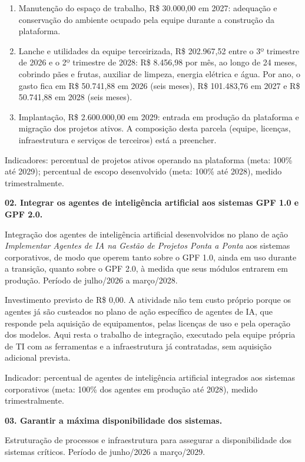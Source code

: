 \documentclass[12pt,a4paper]{article}
\newcommand{\atividade}[1]{%
  \par{\bfseries\color{azulAtividade}#1}\par
}
\begin{document}
\begin{enumerate}
  \item Manutenção do espaço de trabalho, R\$ 30.000,00 em 2027: adequação e conservação do ambiente ocupado pela equipe durante a construção da plataforma.
  \item Lanche e utilidades da equipe terceirizada, R\$ 202.967,52 entre o 3º trimestre de 2026 e o 2º trimestre de 2028: R\$ 8.456,98 por mês, ao longo de 24 meses, cobrindo pães e frutas, auxiliar de limpeza, energia elétrica e água. Por ano, o gasto fica em R\$ 50.741,88 em 2026 (seis meses), R\$ 101.483,76 em 2027 e R\$ 50.741,88 em 2028 (seis meses).
  \item Implantação, R\$ 2.600.000,00 em 2029: entrada em produção da plataforma e migração dos projetos ativos. A composição desta parcela (equipe, licenças, infraestrutura e serviços de terceiros) está a preencher.
\end{enumerate}

Indicadores: percentual de projetos ativos operando na plataforma (meta: 100\% até 2029); percentual de escopo desenvolvido (meta: 100\% até 2028), medido trimestralmente.

\atividade{02. Integrar os agentes de inteligência artificial aos sistemas GPF 1.0 e GPF 2.0.}

Integração dos agentes de inteligência artificial desenvolvidos no plano de ação \textit{Implementar Agentes de IA na Gestão de Projetos Ponta a Ponta} aos sistemas corporativos, de modo que operem tanto sobre o GPF 1.0, ainda em uso durante a transição, quanto sobre o GPF 2.0, à medida que seus módulos entrarem em produção. Período de julho/2026 a março/2028.

Investimento previsto de R\$ 0,00. A atividade não tem custo próprio porque os agentes já são custeados no plano de ação específico de agentes de IA, que responde pela aquisição de equipamentos, pelas licenças de uso e pela operação dos modelos. Aqui resta o trabalho de integração, executado pela equipe própria de TI com as ferramentas e a infraestrutura já contratadas, sem aquisição adicional prevista.

Indicador: percentual de agentes de inteligência artificial integrados aos sistemas corporativos (meta: 100\% dos agentes em produção até 2028), medido trimestralmente.

\atividade{03. Garantir a máxima disponibilidade dos sistemas.}

Estruturação de processos e infraestrutura para assegurar a disponibilidade dos sistemas críticos. Período de junho/2026 a março/2029.
\end{document}
